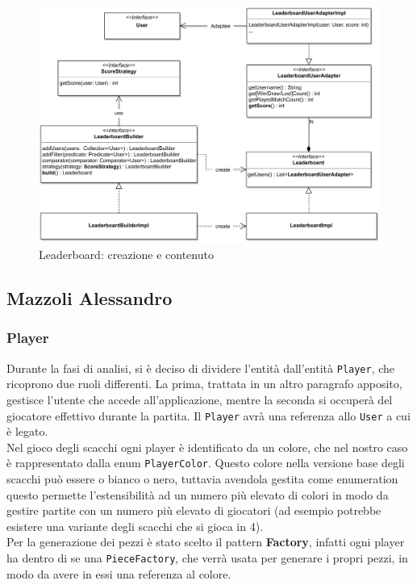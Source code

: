 \documentclass[a4paper,12pt]{report}
\begin{document}
\begin{figure}[ht]
    \begin{center}
        \centering
        \includegraphics[width=\textwidth]{img/Manuel/shadow/Leaderboard.png}
    \end{center}
    \caption{Leaderboard: creazione e contenuto}
    \label{img:Leaderboard}
\end{figure}
%

\clearpage
\subsection{Mazzoli Alessandro}

\subsubsection{Player}
\label{Player}

Durante la fasi di analisi, si è deciso di dividere l'entità \texttt{} dall'entità \texttt{Player}, che ricoprono due ruoli differenti. La prima, trattata in un altro paragrafo apposito, gestisce l'utente che accede all'applicazione, mentre la seconda si occuperà del giocatore effettivo durante la partita. Il \texttt{Player} avrà una referenza allo \texttt{User} a cui è legato.
\\
Nel gioco degli scacchi ogni player è identificato da un colore, che nel nostro caso è rappresentato dalla enum \texttt{PlayerColor}. Questo colore nella versione base degli scacchi può essere o bianco o nero, tuttavia avendola gestita come enumeration questo permette l'estensibilità ad un numero più elevato di colori in modo da gestire partite con un numero più elevato di giocatori (ad esempio potrebbe esistere una variante degli scacchi che si gioca in 4).
\\
Per la generazione dei pezzi è stato scelto il pattern \textbf{Factory}, infatti ogni player ha dentro di se una \texttt{PieceFactory}, che verrà usata per generare i propri pezzi, in modo da avere in essi una referenza al colore.
\end{document}
